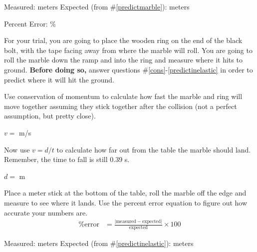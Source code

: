 \documentclass[10pt]{exam}
\begin{document}
\begin{questions}
\begin{center}
  Measured: \fillin[][8em] meters
  \hspace{4em}
  Expected (from \#\ref{predictmarble}): \fillin[][8em]  meters
  \vspace{2em}
\end{center}


\begin{flushright}
  Percent Error: \fillin[][5em]\%
\end{flushright}

\pagebreak

\begin{EnvUplevel}
  For your trial, you are going to place the wooden ring on the end of the black bolt, with the tape facing away from where the marble will roll. You are going to roll the marble down the ramp and into the ring and measure where it hits to ground.  {\bf Before doing so,} answer questions \#\ref{cons}-\ref{predictinelastic} in order to predict where it will hit the ground.
\end{EnvUplevel}


\question \label{cons}
Use conservation of momentum to calculate how fast the marble and ring will move together assuming they stick together after the collision (not a perfect assumption, but pretty close).
\vs[3]

\begin{flushright}
  $v =$ \fillin[][8em] m/s
\end{flushright}


\question \label{predictinelastic}
Now use $v = d/t$ to calculate how far out from the table the marble should land. Remember, the time to fall is still 0.39 s.
\vs

\begin{flushright}
  $d =$ \fillin[][8em] m
\end{flushright}

\question
Place a meter stick at the bottom of the table, roll the marble off the edge and measure to see where it lands. Use the percent error equation to figure out how accurate your numbers are.
%
\begin{align*}
  \text{\% error} &=  
  \frac{
    \left|\text{measured}-\text{expected}\right|
    }{
      \text{expected}
    } 
  \times 100
\end{align*}

\begin{center}
  Measured: \fillin[][8em] meters
  \hspace{4em}
  Expected (from \#\ref{predictinelastic}): \fillin[][8em]  meters
  \vspace{2em}
\end{center}


\end{questions}
\end{document}

